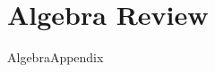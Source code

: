 \documentclass[11pt]{book}
\theoremstyle{definition}  %
\begin{document}






\appendix

\chapter{Algebra Review}
\label{AlgebraAppendix}
{AlgebraAppendix}
\end{document}
